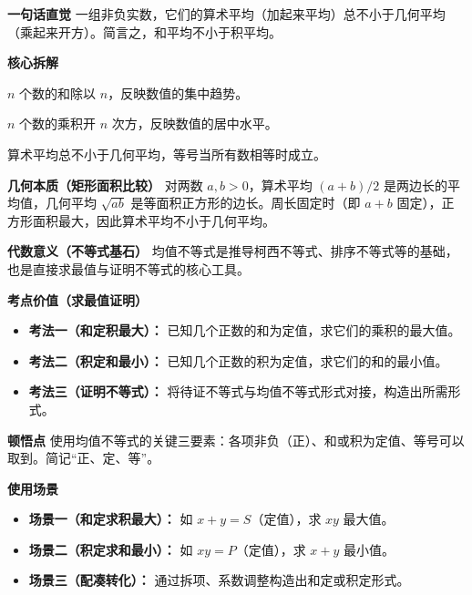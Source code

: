 \begin{explanationbox}
	\textbf{\textcolor{CExplanation}{一句话直觉}}
	一组非负实数，它们的算术平均（加起来平均）总不小于几何平均（乘起来开方）。简言之，和平均不小于积平均。

	\medskip
	\textbf{\textcolor{CExplanation}{核心拆解}}
	\begin{description}[style=nextline, leftmargin=2.8em, labelsep=0.5em, itemsep=0.45em]
		\item[\textbf{要点一（算术平均）：}]
			$n$ 个数的和除以 $n$，反映数值的集中趋势。
		\item[\textbf{要点二（几何平均）：}]
			$n$ 个数的乘积开 $n$ 次方，反映数值的居中水平。
		\item[\textbf{要点三（大小关系）：}]
			算术平均总不小于几何平均，等号当所有数相等时成立。
	\end{description}

	\medskip
	\textbf{\textcolor{CExplanation}{几何本质（矩形面积比较）}}
	对两数 $a,b>0$，算术平均 $(a+b)/2$ 是两边长的平均值，几何平均 $\sqrt{ab}$ 是等面积正方形的边长。周长固定时（即 $a+b$ 固定），正方形面积最大，因此算术平均不小于几何平均。

	\medskip
	\textbf{\textcolor{CExplanation}{代数意义（不等式基石）}}
	均值不等式是推导柯西不等式、排序不等式等的基础，也是直接求最值与证明不等式的核心工具。

	\medskip
	\textbf{\textcolor{CExplanation}{考点价值（求最值证明）}}
	\begin{itemize}[leftmargin=*, itemsep=0.5em, topsep=0.4em]
		\item \textbf{考法一（和定积最大）：} 已知几个正数的和为定值，求它们的乘积的最大值。
		\item \textbf{考法二（积定和最小）：} 已知几个正数的积为定值，求它们的和的最小值。
		\item \textbf{考法三（证明不等式）：} 将待证不等式与均值不等式形式对接，构造出所需形式。
	\end{itemize}

	\medskip
	\textbf{\textcolor{CExplanation}{顿悟点}}
	使用均值不等式的关键三要素：各项非负（正）、和或积为定值、等号可以取到。简记“正、定、等”。

	\medskip
	\textbf{\textcolor{CExplanation}{使用场景}}
	\begin{itemize}[leftmargin=*, itemsep=0.5em, topsep=0.4em]
		\item \textbf{场景一（和定求积最大）：} 如 $x+y= S$（定值），求 $xy$ 最大值。
		\item \textbf{场景二（积定求和最小）：} 如 $xy= P$（定值），求 $x+y$ 最小值。
		\item \textbf{场景三（配凑转化）：} 通过拆项、系数调整构造出和定或积定形式。
	\end{itemize}

\end{explanationbox}

